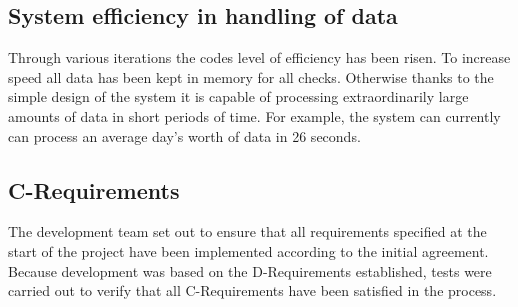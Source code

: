 \documentclass[12pt]{article}
\begin{document}
\subsection{System efficiency in handling of data}
Through various iterations the codes level of efficiency has been risen. To increase speed all data has been kept in memory for all checks.
Otherwise thanks to the simple design of the system it is capable of processing extraordinarily large amounts of data in short periods of time.
For example, the system can currently can process an average day's worth of data in 26 seconds.
\subsection{C-Requirements}
The development team set out to ensure that all requirements specified at the start of the project have been implemented according to the initial agreement.
Because development was based on the D-Requirements established, tests were carried out to verify that all C-Requirements have been satisfied in the process.
\end{document}
